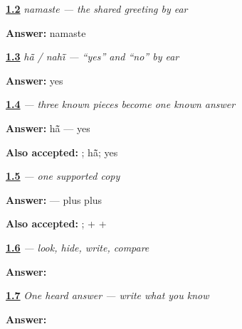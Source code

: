 \noindent\begin{minipage}[t]{\linewidth}
\raggedright
\hyperlink{review-PA-C01-namaste-context}{\textbf{1.2}} \emph{\emph{namaste} — the shared greeting by ear}\par
\small \textbf{Answer:} namaste\par
\end{minipage}\par\medskip

\noindent\begin{minipage}[t]{\linewidth}
\raggedright
\hyperlink{review-PA-C01-han-nahin-heard-meaning}{\textbf{1.3}} \emph{\emph{hā̃} / \emph{nahī̃} — “yes” and “no” by ear}\par
\small \textbf{Answer:} yes\par
\end{minipage}\par\medskip

\noindent\begin{minipage}[t]{\linewidth}
\raggedright
\hyperlink{review-PA-W01-haan-assemble-read}{\textbf{1.4}} \emph{ — three known pieces become one known answer}\par
\small \textbf{Answer:} hā̃ — yes\par
\footnotesize \textbf{Also accepted:} ; hā̃; yes
\end{minipage}\par\medskip

\noindent\begin{minipage}[t]{\linewidth}
\raggedright
\hyperlink{review-PA-W01-haan-guided-copy-check}{\textbf{1.5}} \emph{ — one supported copy}\par
\small \textbf{Answer:}  —  plus  plus \par
\footnotesize \textbf{Also accepted:} ;  +  + 
\end{minipage}\par\medskip

\noindent\begin{minipage}[t]{\linewidth}
\raggedright
\hyperlink{review-PA-W01-haan-delayed-copy-check}{\textbf{1.6}} \emph{ — look, hide, write, compare}\par
\small \textbf{Answer:} \par
\end{minipage}\par\medskip

\noindent\begin{minipage}[t]{\linewidth}
\raggedright
\hyperlink{review-PA-W01-haan-dictation-answer}{\textbf{1.7}} \emph{One heard answer — write what you know}\par
\small \textbf{Answer:} \par
\end{minipage}\par\medskip


